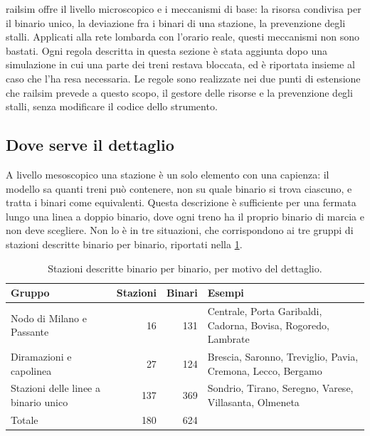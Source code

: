railsim offre il livello microscopico e i meccanismi di base: la risorsa condivisa per il binario unico, la deviazione fra i binari di una stazione, la prevenzione degli stalli. Applicati alla rete lombarda con l'orario reale, questi meccanismi non sono bastati. Ogni regola descritta in questa sezione è stata aggiunta dopo una simulazione in cui una parte dei treni restava bloccata, ed è riportata insieme al caso che l'ha resa necessaria. Le regole sono realizzate nei due punti di estensione che railsim prevede a questo scopo, il gestore delle risorse e la prevenzione degli stalli, senza modificare il codice dello strumento.

\subsection{Dove serve il dettaglio}
A livello mesoscopico una stazione è un solo elemento con una capienza: il modello sa quanti treni può contenere, non su quale binario si trova ciascuno, e tratta i binari come equivalenti. Questa descrizione è sufficiente per una fermata lungo una linea a doppio binario, dove ogni treno ha il proprio binario di marcia e non deve scegliere. Non lo è in tre situazioni, che corrispondono ai tre gruppi di stazioni descritte binario per binario, riportati nella \cref{tab:dettaglio-gruppi}.

\begin{table}[H]
	\centering
	\caption{Stazioni descritte binario per binario, per motivo del dettaglio.}
	\label{tab:dettaglio-gruppi}
	\begin{tabularx}{\textwidth}{>{\raggedright\arraybackslash}p{}rr>{\raggedright\arraybackslash}X}
		\toprule
		Gruppo & Stazioni & Binari & Esempi \\
		\midrule
		Nodo di Milano e Passante & 16 & 131 & Centrale, Porta Garibaldi, Cadorna, Bovisa, Rogoredo, Lambrate \\
		Diramazioni e capolinea & 27 & 124 & Brescia, Saronno, Treviglio, Pavia, Cremona, Lecco, Bergamo \\
		Stazioni delle linee a binario unico & 137 & 369 & Sondrio, Tirano, Seregno, Varese, Villasanta, Olmeneta \\
		\midrule
		Totale & 180 & 624 & \\
		\bottomrule
	\end{tabularx}
\end{table}

